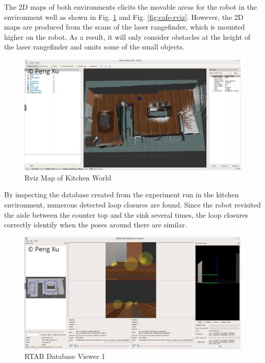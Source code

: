 \documentclass[10pt,journal,compsoc]{IEEEtran}
\begin{document}
The 2D maps of both environments elicits the movable areas for the robot in the environment well as shown in Fig. \ref{fig:kitchen-rviz} and Fig. \ref{fig:cafe-rviz}. However, the 2D maps are produced from the scans of the laser rangefinder, which is mounted higher on the robot. As a result, it will only consider obstacles at the height of the laser rangefinder and omits some of the small objects.

\begin{figure}[thpb]
      \centering
      \includegraphics[width=\linewidth]{images/kitchen-rviz.png}
      \caption{Rviz Map of Kitchen World}
      \label{fig:kitchen-rviz}
\end{figure}

By inspecting the database created from the experiment run in the kitchen environment, numerous detected loop closures are found. Since the robot revisited the aisle between the counter top and the sink several times, the loop closures correctly identify when the poses around there are similar.

\begin{figure}[thpb]
      \centering
      \includegraphics[width=\linewidth]{images/kitchen-database-viewer.png}
      \caption{RTAB Database Viewer 1}
      \label{fig:kitchen-database-viewer}
\end{figure}
\end{document}
